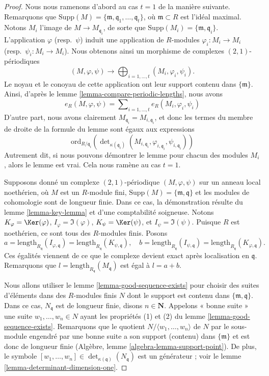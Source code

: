 \begin{proof}
Nous nous ramenons d'abord au cas $t = 1$ de la manière suivante.
Remarquons que
$\text{Supp}(M) = \{\mathfrak m, \mathfrak q_1, \ldots, \mathfrak q_t\}$,
où $\mathfrak m \subset R$ est l'idéal maximal.
Notons $M_i$ l'image de $M \to M_{\mathfrak q_i}$,
de sorte que $\text{Supp}(M_i) = \{\mathfrak m, \mathfrak q_i\}$.
L'application $\varphi$ (resp.\ $\psi$) induit une application de $R$-modules
$\varphi_i : M_i \to M_i$ (resp.\ $\psi_i : M_i \to M_i$).
Nous obtenons ainsi un morphisme de complexes $(2, 1)$-périodiques
$$
(M, \varphi, \psi) \longrightarrow
\bigoplus\nolimits_{i = 1, \ldots, t} (M_i, \varphi_i, \psi_i).
$$
Le noyau et le conoyau de cette application ont leur support contenu dans
$\{\mathfrak m\}$. Ainsi, d'après le lemme \ref{lemma-compare-periodic-lengths},
nous avons
$$
e_R(M, \varphi, \psi) =
\sum\nolimits_{i = 1, \ldots, t}
e_R(M_i, \varphi_i, \psi_i)
$$
D'autre part, nous avons clairement $M_{\mathfrak q_i} = M_{i, \mathfrak q_i}$,
et donc les termes du membre de droite de la formule du
lemme sont égaux aux expressions
$$
\text{ord}_{R/\mathfrak q_i}\left(
\det\nolimits_{\kappa(\mathfrak q_i)}
(M_{i, \mathfrak q_i}, \varphi_{i, \mathfrak q_i}, \psi_{i, \mathfrak q_i})
\right)
$$
Autrement dit, si nous pouvons démontrer le lemme pour chacun des modules
$M_i$, alors le lemme est vrai. Cela nous ramène au cas $t = 1$.

\medskip\noindent
Supposons donné un complexe $(2, 1)$-périodique $(M, \varphi, \psi)$
sur un anneau local noethérien, où $M$ est un $R$-module fini,
$\text{Supp}(M) = \{\mathfrak m, \mathfrak q\}$ et les modules de cohomologie
sont de longueur finie. Dans ce cas, la démonstration
résulte du lemme \ref{lemma-key-lemma} et d'une comptabilité soigneuse.
Notons
$K_\varphi = \Ker(\varphi)$,
$I_\varphi = \Im(\varphi)$,
$K_\psi = \Ker(\psi)$, et
$I_\psi = \Im(\psi)$.
Puisque $R$ est noethérien, ce sont tous des $R$-modules finis.
Posons
$$
a = \text{length}_{R_{\mathfrak q}}(I_{\varphi, \mathfrak q})
= \text{length}_{R_{\mathfrak q}}(K_{\psi, \mathfrak q}),
\quad
b = \text{length}_{R_{\mathfrak q}}(I_{\psi, \mathfrak q})
= \text{length}_{R_{\mathfrak q}}(K_{\varphi, \mathfrak q}).
$$
Ces égalités viennent de ce que le complexe devient exact après localisation en
$\mathfrak q$. Remarquons que $l = \text{length}_{R_{\mathfrak q}}(M_{\mathfrak q})$
est égal à $l = a + b$.

\medskip\noindent
Nous allons utiliser le lemme \ref{lemma-good-sequence-exists}
pour choisir des suites d'éléments dans des $R$-modules finis
$N$ dont le support est contenu dans $\{\mathfrak m, \mathfrak q\}$.
Dans ce cas, $N_{\mathfrak q}$ est de longueur finie, disons $n \in \mathbf{N}$.
Appelons « bonne suite » une suite $w_1, \ldots, w_n \in N$
ayant les propriétés (1) et (2) du lemme \ref{lemma-good-sequence-exists}.
Remarquons que le quotient
$N/\langle w_1, \ldots, w_n \rangle$ de $N$ par le sous-module engendré par
une bonne suite a son support (contenu) dans $\{\mathfrak m\}$
et est donc de longueur finie (Algèbre, lemme \ref{algebra-lemma-support-point}).
De plus, le symbole
$[w_1, \ldots, w_n] \in \det_{\kappa(\mathfrak q)}(N_{\mathfrak q})$
est un générateur ; voir le lemme \ref{lemma-determinant-dimension-one}.


\end{proof}
